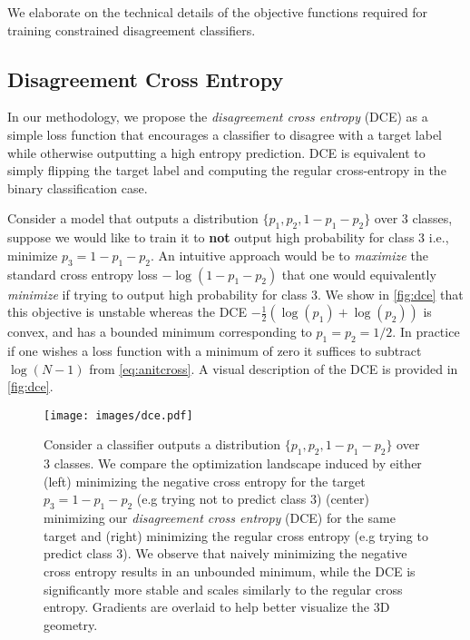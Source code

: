 We elaborate on the technical details of the objective functions required for training constrained disagreement classifiers.

\subsection{Disagreement Cross Entropy}\label{subsec:disagreement-cross-entropy}
In our methodology, we propose the \textit{disagreement cross entropy} (DCE) as a simple loss function that encourages a classifier to disagree with a target label while otherwise outputting a high entropy prediction.
DCE is equivalent to simply flipping the target label and computing the regular cross-entropy in the binary classification case.

Consider a model that outputs a distribution $\{p_1, p_2, 1-p_1-p_2\}$ over $3$ classes, suppose we would like to train it to \textbf{not} output high probability for class $3$ i.e., minimize $p_3=1-p_1-p_2$.
An intuitive approach would be to \textit{maximize} the standard cross entropy loss $-\log(1-p_1-p_2)$ that one would equivalently \textit{minimize} if trying to output high probability for class $3$.
We show in \autoref{fig:dce} that this objective is unstable whereas the DCE $-\frac{1}{2}(\log(p_1) + \log(p_2))$ is convex, and has a bounded minimum corresponding to $p_1=p_2=1/2$.
In practice if one wishes a loss function with a minimum of zero it suffices to subtract $ \log(N-1)$ from \autoref{eq:anitcross}.
A visual description of the DCE is provided in \autoref{fig:dce}.
\begin{figure}[!htb]
    \centering
    \texttt{[image: images/dce.pdf]}
    \caption{Consider a classifier outputs a distribution $\{p_1, p_2, 1-p_1-p_2\}$ over $3$ classes. We compare the optimization landscape induced by either (left) minimizing the negative cross entropy for the target $p_3=1-p_1-p_2$ (e.g trying not to predict class $3$) (center) minimizing our \textit{disagreement cross entropy} (DCE) for the same target
    and (right) minimizing the regular cross entropy (e.g trying to predict class $3$). We observe that naively minimizing the negative cross entropy results in an unbounded minimum, while the DCE is significantly more stable and scales similarly to the regular cross entropy. Gradients are overlaid to help better visualize the 3D geometry.}
    \label{fig:dce}
\end{figure}

